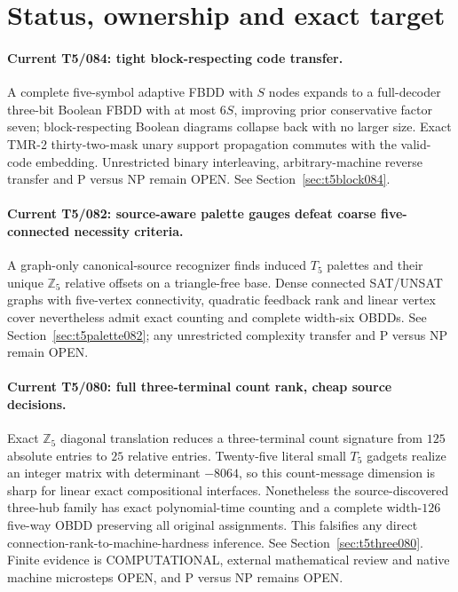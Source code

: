 \documentclass[11pt]{article}
\begin{document}
\section{Status, ownership and exact target}


\paragraph{Current T5/084: tight block-respecting code transfer.}
A complete five-symbol adaptive FBDD with $S$ nodes expands
to a full-decoder three-bit Boolean FBDD with at most $6S$,
improving prior conservative factor seven; block-respecting
Boolean diagrams collapse back with no larger size. Exact
TMR-2 thirty-two-mask unary support propagation commutes with
the valid-code embedding. Unrestricted binary interleaving,
arbitrary-machine reverse transfer and P versus NP remain OPEN.
See Section~\ref{sec:t5block084}.


\paragraph{Current T5/082: source-aware palette gauges defeat coarse
five-connected necessity criteria.}
A graph-only canonical-source recognizer finds induced $T_5$ palettes
and their unique $\mathbb Z_5$ relative offsets on a triangle-free
base. Dense connected SAT/UNSAT graphs with five-vertex connectivity,
quadratic feedback rank and linear vertex cover nevertheless admit
exact counting and complete width-six OBDDs.
See Section~\ref{sec:t5palette082}; any unrestricted complexity
transfer and P versus NP remain OPEN.


\paragraph{Current T5/080: full three-terminal count rank, cheap source decisions.}
Exact $\mathbb{Z}_5$ diagonal translation reduces a three-terminal
count signature from $125$ absolute entries to $25$ relative entries.
Twenty-five literal small $T_5$ gadgets realize an integer matrix with
determinant $-8064$, so this count-message dimension is sharp for
linear exact compositional interfaces. Nonetheless the source-discovered
three-hub family has exact polynomial-time counting and a complete
width-$126$ five-way OBDD preserving all original assignments.
This falsifies any direct connection-rank-to-machine-hardness inference.
See Section~\ref{sec:t5three080}. Finite evidence is COMPUTATIONAL,
external mathematical review and native machine microsteps OPEN,
and P versus NP remains OPEN.
\end{document}
